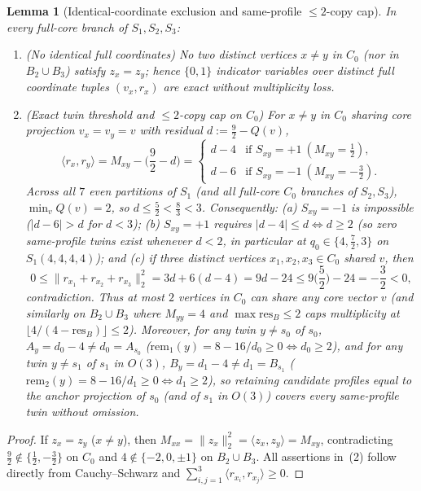 \documentclass[11pt,reqno]{amsart}
\newtheorem{lemma}[theorem]{Lemma}
\theoremstyle{definition}
\theoremstyle{remark}
\numberwithin{equation}{section}
\numberwithin{table}{section}
\begin{document}
\begin{lemma}[Identical-coordinate exclusion and same-profile $\le 2$-copy cap]\label{lem:alg810}
In every full-core branch of $S_1, S_2, S_3$:
\begin{enumerate}
  \item \emph{(No identical full coordinates)} No two distinct vertices $x \neq y$ in $C_0$ (nor in $B_2 \cup B_3$) satisfy $z_x = z_y$; hence $\{0, 1\}$ indicator variables over distinct full coordinate tuples $(v_x, r_x)$ are exact without multiplicity loss.
  \item \emph{(Exact twin threshold and $\le 2$-copy cap on $C_0$)} For $x \neq y$ in $C_0$ sharing core projection $v_x = v_y = v$ with residual $d := \frac{9}{2} - Q(v)$,
  \[
    \langle r_x, r_y \rangle = M_{xy} - \Big(\frac{9}{2} - d\Big) = \begin{cases} d - 4 & \text{if } S_{xy} = +1\ (M_{xy} = \frac{1}{2}), \\ d - 6 & \text{if } S_{xy} = -1\ (M_{xy} = -\frac{3}{2}). \end{cases}
  \]
  Across all $7$ even partitions of $S_1$ (and all full-core $C_0$ branches of $S_2, S_3$), $\min_v Q(v) = 2$, so $d \le \frac{5}{2} < \frac{8}{3} < 3$. Consequently: (a) $S_{xy} = -1$ is impossible ($|d - 6| > d$ for $d < 3$); (b) $S_{xy} = +1$ requires $|d - 4| \le d \iff d \ge 2$ (so zero same-profile twins exist whenever $d < 2$, in particular at $q_0 \in \{4, \frac{7}{2}, 3\}$ on $S_1(4,4,4,4)$); and (c) if three distinct vertices $x_1, x_2, x_3 \in C_0$ shared $v$, then
  \[
    0 \le \|r_{x_1} + r_{x_2} + r_{x_3}\|_2^2 = 3d + 6(d - 4) = 9d - 24 \le 9\Big(\frac{5}{2}\Big) - 24 = -\frac{3}{2} < 0,
  \]
  contradiction. Thus at most $2$ vertices in $C_0$ can share any core vector $v$ (and similarly on $B_2 \cup B_3$ where $M_{yy} = 4$ and $\max \mathrm{res}_B \le 2$ caps multiplicity at $\lfloor 4/(4 - \mathrm{res}_B) \rfloor \le 2$). Moreover, for any twin $y \neq s_0$ of $s_0$, $A_y = d_0 - 4 \neq d_0 = A_{s_0}$ ($\mathrm{rem}_1(y) = 8 - 16/d_0 \ge 0 \iff d_0 \ge 2$), and for any twin $y \neq s_1$ of $s_1$ in $O(3)$, $B_y = d_1 - 4 \neq d_1 = B_{s_1}$ ($\mathrm{rem}_2(y) = 8 - 16/d_1 \ge 0 \iff d_1 \ge 2$), so retaining candidate profiles equal to the anchor projection of $s_0$ (and of $s_1$ in $O(3)$) covers every same-profile twin without omission.
\end{enumerate}
\end{lemma}

\begin{proof}
If $z_x = z_y$ ($x \neq y$), then $M_{xx} = \|z_x\|_2^2 = \langle z_x, z_y \rangle = M_{xy}$, contradicting $\frac{9}{2} \notin \{\frac{1}{2}, -\frac{3}{2}\}$ on $C_0$ and $4 \notin \{-2, 0, \pm 1\}$ on $B_2 \cup B_3$. All assertions in~(2) follow directly from Cauchy--Schwarz and $\sum_{i,j=1}^3 \langle r_{x_i}, r_{x_j} \rangle \ge 0$.
\end{proof}
\end{document}
